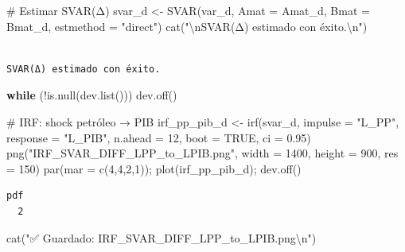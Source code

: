 \documentclass[
  spanish,
  letterpaper,
  DIV=11,
  numbers=noendperiod]{scrartcl}
\newenvironment{Shaded}{\begin{snugshade}}{\end{snugshade}}
\newcommand{\AttributeTok}[1]{\textcolor[rgb]{0.40,0.45,0.13}{#1}}
\newcommand{\CommentTok}[1]{\textcolor[rgb]{0.37,0.37,0.37}{#1}}
\newcommand{\ConstantTok}[1]{\textcolor[rgb]{0.56,0.35,0.01}{#1}}
\newcommand{\ControlFlowTok}[1]{\textcolor[rgb]{0.00,0.23,0.31}{\textbf{#1}}}
\newcommand{\DecValTok}[1]{\textcolor[rgb]{0.68,0.00,0.00}{#1}}
\newcommand{\FloatTok}[1]{\textcolor[rgb]{0.68,0.00,0.00}{#1}}
\newcommand{\FunctionTok}[1]{\textcolor[rgb]{0.28,0.35,0.67}{#1}}
\newcommand{\NormalTok}[1]{\textcolor[rgb]{0.00,0.23,0.31}{#1}}
\newcommand{\OtherTok}[1]{\textcolor[rgb]{0.00,0.23,0.31}{#1}}
\newcommand{\SpecialCharTok}[1]{\textcolor[rgb]{0.37,0.37,0.37}{#1}}
\newcommand{\StringTok}[1]{\textcolor[rgb]{0.13,0.47,0.30}{#1}}
\begin{document}
\begin{Shaded}
\begin{Highlighting}[]
\CommentTok{\# Estimar SVAR(Δ)}
\NormalTok{svar\_d }\OtherTok{\textless{}{-}} \FunctionTok{SVAR}\NormalTok{(var\_d, }\AttributeTok{Amat =}\NormalTok{ Amat\_d, }\AttributeTok{Bmat =}\NormalTok{ Bmat\_d, }\AttributeTok{estmethod =} \StringTok{"direct"}\NormalTok{)}
\FunctionTok{cat}\NormalTok{(}\StringTok{"}\SpecialCharTok{\textbackslash{}n}\StringTok{SVAR(Δ) estimado con éxito.}\SpecialCharTok{\textbackslash{}n}\StringTok{"}\NormalTok{)}
\end{Highlighting}
\end{Shaded}

\begin{verbatim}

SVAR(Δ) estimado con éxito.
\end{verbatim}

\begin{Shaded}
\begin{Highlighting}[]
\ControlFlowTok{while}\NormalTok{ (}\SpecialCharTok{!}\FunctionTok{is.null}\NormalTok{(}\FunctionTok{dev.list}\NormalTok{())) }\FunctionTok{dev.off}\NormalTok{()}

\CommentTok{\# IRF: shock petróleo → PIB}
\NormalTok{irf\_pp\_pib\_d }\OtherTok{\textless{}{-}} \FunctionTok{irf}\NormalTok{(svar\_d, }\AttributeTok{impulse =} \StringTok{"L\_PP"}\NormalTok{, }\AttributeTok{response =} \StringTok{"L\_PIB"}\NormalTok{,}
                    \AttributeTok{n.ahead =} \DecValTok{12}\NormalTok{, }\AttributeTok{boot =} \ConstantTok{TRUE}\NormalTok{, }\AttributeTok{ci =} \FloatTok{0.95}\NormalTok{)}
\FunctionTok{png}\NormalTok{(}\StringTok{"IRF\_SVAR\_DIFF\_LPP\_to\_LPIB.png"}\NormalTok{, }\AttributeTok{width =} \DecValTok{1400}\NormalTok{, }\AttributeTok{height =} \DecValTok{900}\NormalTok{, }\AttributeTok{res =} \DecValTok{150}\NormalTok{)}
\FunctionTok{par}\NormalTok{(}\AttributeTok{mar =} \FunctionTok{c}\NormalTok{(}\DecValTok{4}\NormalTok{,}\DecValTok{4}\NormalTok{,}\DecValTok{2}\NormalTok{,}\DecValTok{1}\NormalTok{)); }\FunctionTok{plot}\NormalTok{(irf\_pp\_pib\_d); }\FunctionTok{dev.off}\NormalTok{()}
\end{Highlighting}
\end{Shaded}

\begin{verbatim}
pdf 
  2 
\end{verbatim}

\begin{Shaded}
\begin{Highlighting}[]
\FunctionTok{cat}\NormalTok{(}\StringTok{"✅ Guardado: IRF\_SVAR\_DIFF\_LPP\_to\_LPIB.png}\SpecialCharTok{\textbackslash{}n}\StringTok{"}\NormalTok{)}
\end{Highlighting}
\end{Shaded}
\end{document}
